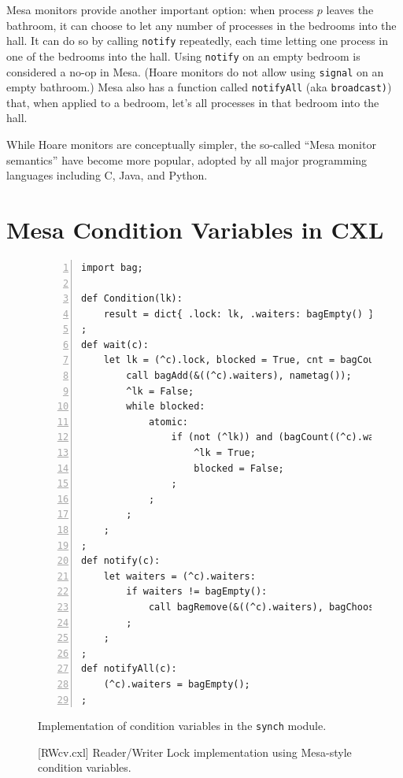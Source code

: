 \documentclass{report}
\newenvironment{code}{
\tcolorbox
}{
\endtcolorbox
}
\begin{document}
Mesa monitors provide another important option:
when process $p$ leaves the bathroom, it can choose to let any number of
processes in the bedrooms into the hall.  It can do so by calling
\texttt{notify} repeatedly, each time letting one process in one of the
bedrooms into the hall.  Using \texttt{notify} on an empty
bedroom is considered a no-op in Mesa.  (Hoare monitors do not allow
using \texttt{signal} on an empty bathroom.) Mesa also has a function called
\texttt{notifyAll} (aka \texttt{broadcast)}) that, when applied to
a bedroom, let's all processes in that bedroom into the hall.

While Hoare monitors are conceptually simpler, the so-called
``Mesa monitor semantics'' have become more popular, adopted by all major
programming languages including C, Java, and Python.

\chapter{Mesa Condition Variables in CXL}

\begin{figure}
\begin{code}
\begin{Verbatim}[xleftmargin=5mm,numbers=left]
import bag;

def Condition(lk):
    result = dict{ .lock: lk, .waiters: bagEmpty() };
;
def wait(c):
    let lk = (^c).lock, blocked = True, cnt = bagCount((^c).waiters, nametag()):
        call bagAdd(&((^c).waiters), nametag());
        ^lk = False;
        while blocked:
            atomic:
                if (not (^lk)) and (bagCount((^c).waiters, nametag()) <= cnt):
                    ^lk = True;
                    blocked = False;
                ;
            ;
        ;
    ;
;
def notify(c):
    let waiters = (^c).waiters:
        if waiters != bagEmpty():
            call bagRemove(&((^c).waiters), bagChoose(waiters));
        ;
    ;
;
def notifyAll(c):
    (^c).waiters = bagEmpty();
;
\end{Verbatim}
\end{code}
\caption{Implementation of condition variables in the \texttt{synch} module.}
\label{fig:cv}
\end{figure}

\begin{figure}
\begin{code}
\end{code}
\caption{[RWcv.cxl] Reader/Writer Lock implementation using Mesa-style condition variables.}
\label{fig:RWcv}
\end{figure}
\end{document}
